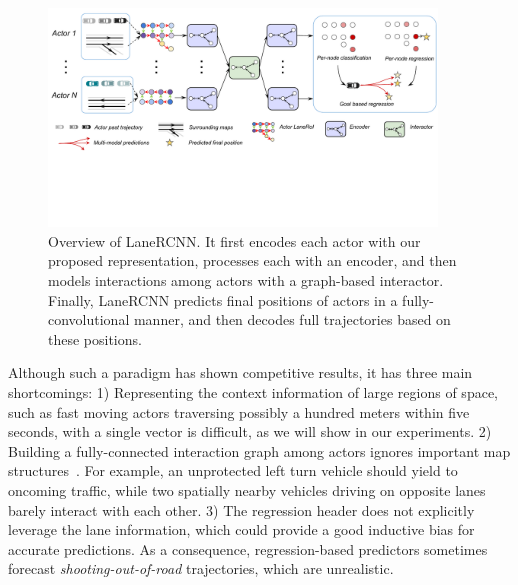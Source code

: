 \begin{figure}[t]
\vspace{-0.2cm}
\begin{center}
  \includegraphics[height=5.8cm]{figures/lanercnn.pdf}
\end{center}
\vspace{-0.3cm}
\caption{Overview of LaneRCNN. It first
encodes each actor with our proposed \ROI representation, processes
each \ROI with an encoder, and then models interactions among actors with a
graph-based interactor. Finally, LaneRCNN predicts final positions of actors in
a fully-convolutional manner, and then decodes full trajectories based on these
positions.}
\vspace{-0.2cm}
\label{fig:lanercnn}
\end{figure}

Although such a paradigm has shown competitive results, it has three main shortcomings:
1) Representing the context information of large regions of space, such as fast
moving actors traversing possibly a hundred meters within five seconds, with a
single vector is difficult, as we will show in our experiments.
2) Building a fully-connected interaction graph among actors ignores important map
structures~\cite{lgn}. For example, an unprotected left turn vehicle should yield to oncoming traffic, while two
spatially nearby vehicles driving on opposite lanes barely interact with each other.
3) The regression header does not explicitly leverage the lane information, which could provide a good inductive bias for accurate predictions. 
As a consequence, regression-based
predictors sometimes forecast \textit{shooting-out-of-road} trajectories, which
are unrealistic. 






